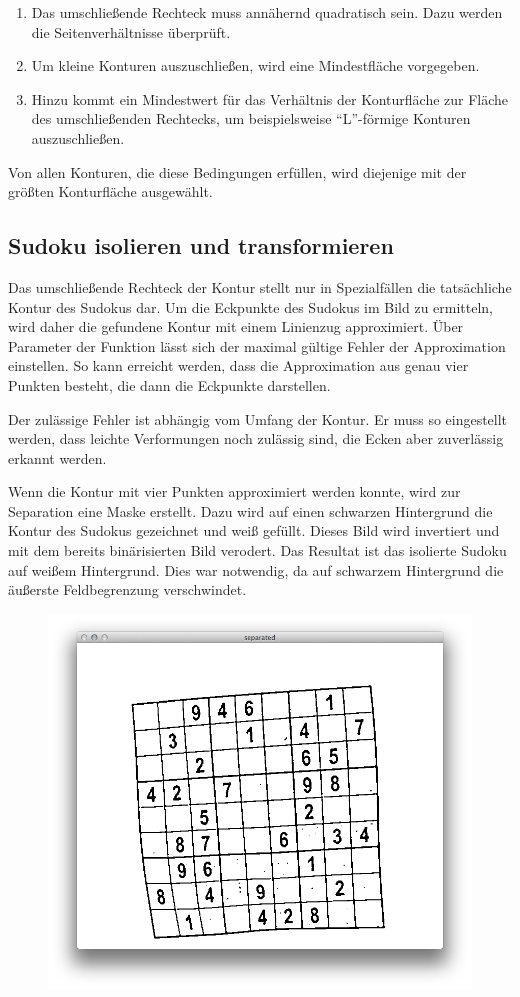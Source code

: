\begin{enumerate}
    \item Das umschließende Rechteck muss annähernd quadratisch sein. Dazu werden die Seitenverhältnisse überprüft.
    \item Um kleine Konturen auszuschließen, wird eine Mindestfläche vorgegeben.
    \item Hinzu kommt ein Mindestwert für das Verhältnis der Konturfläche zur Fläche des umschließenden Rechtecks, um beispielsweise ``L''-förmige Konturen auszuschließen.
\end{enumerate}

Von allen Konturen, die diese Bedingungen erfüllen, wird diejenige mit der größten Konturfläche ausgewählt.


\subsection{Sudoku isolieren und transformieren}
Das umschließende Rechteck der Kontur stellt nur in Spezialfällen die tatsächliche Kontur des Sudokus dar.
Um die Eckpunkte des Sudokus im Bild zu ermitteln, wird daher die gefundene Kontur mit einem Linienzug approximiert.
Über Parameter der Funktion lässt sich der maximal gültige Fehler der Approximation einstellen.
So kann erreicht werden, dass die Approximation aus genau vier Punkten besteht, die dann die Eckpunkte darstellen.

Der zulässige Fehler ist abhängig vom Umfang der Kontur.
Er muss so eingestellt werden, dass leichte Verformungen noch zulässig sind, die Ecken aber zuverlässig erkannt werden.

Wenn die Kontur mit vier Punkten approximiert werden konnte, wird zur Separation eine Maske erstellt.
Dazu wird auf einen schwarzen Hintergrund die Kontur des Sudokus gezeichnet und weiß gefüllt.
Dieses Bild wird invertiert und mit dem bereits binärisierten Bild verodert.
Das Resultat ist das isolierte Sudoku auf weißem Hintergrund.
Dies war notwendig, da auf schwarzem Hintergrund die äußerste Feldbegrenzung verschwindet.

\begin{figure}[h!]
    \begin{center}
        \includegraphics[width=.5\textwidth]{Abbildungen/separated}
    \end{center}
\end{figure}

